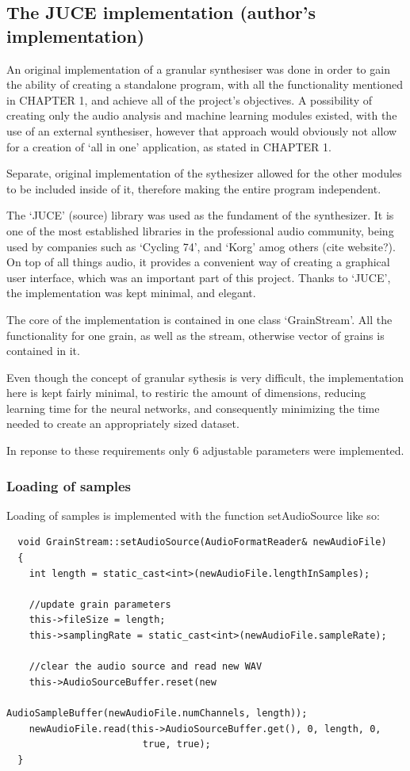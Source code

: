 \subsection{The JUCE implementation (author's implementation)}

An original implementation of a granular synthesiser was done in order
to gain the ability of creating a standalone program, with all the
functionality mentioned in CHAPTER 1, and achieve all of the project's
objectives. A possibility of creating only the audio analysis and
machine learning modules existed, with the use of an external
synthesiser, however that approach would obviously not allow for a
creation of `all in one' application, as stated in CHAPTER 1.

Separate, original implementation of the sythesizer allowed for the other
modules to be included inside of it, therefore making the entire
program independent.

The `JUCE' (source) library was used as the fundament of the
synthesizer.  It is one of the most established libraries in the
professional audio community, being used by companies such as `Cycling
74', and `Korg' amog others (cite website?). On top of all things
audio, it provides a convenient way of creating a graphical user
interface, which was an important part of this project. Thanks to
`JUCE', the implementation was kept minimal, and elegant.

The core of the implementation is contained in one class
`GrainStream'. All the functionality for one grain, as well as the
stream, otherwise vector of grains is contained in it.

Even though the concept of granular sythesis is very difficult, the
implementation here is kept fairly minimal, to restiric the amount of
dimensions, reducing learning time for the neural networks, and
consequently minimizing the time needed to create an appropriately
sized dataset.

In reponse to these requirements only 6 adjustable parameters were
implemented.

\subsubsection{Loading of samples}

Loading of samples is implemented with the function setAudioSource
like so:
\begin{lstlisting}
  void GrainStream::setAudioSource(AudioFormatReader& newAudioFile)
  {
    int length = static_cast<int>(newAudioFile.lengthInSamples);

    //update grain parameters
    this->fileSize = length;
    this->samplingRate = static_cast<int>(newAudioFile.sampleRate);

    //clear the audio source and read new WAV
    this->AudioSourceBuffer.reset(new
                                     AudioSampleBuffer(newAudioFile.numChannels, length));
    newAudioFile.read(this->AudioSourceBuffer.get(), 0, length, 0,
                        true, true);
  }
\end{lstlisting}

